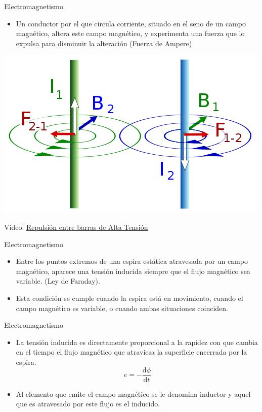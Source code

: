 \documentclass[xcolor={usenames,svgnames,dvipsnames}]{beamer}
\begin{document}
\begin{frame}[label={sec:org4979ed0}]{Electromagnetismo}
\begin{itemize}
\item Un conductor por el que circula corriente, situado en el seno de un
campo magnético, altera este campo magnético, y experimenta una
fuerza que lo expulsa para disminuir la alteración (Fuerza de Ampere)
\end{itemize}

\begin{center}
\includegraphics[width=.9\linewidth]{../figs/FuerzasRepulsion.png}
\end{center}

\begin{center}
Vídeo: \href{http://www.youtube.com/watch?v=2j8D\_N1v0tU}{Repulsión entre barras de Alta Tensión}
\end{center}
\end{frame}

\begin{frame}[label={sec:org465bf10}]{Electromagnetismo}
\begin{itemize}
\item Entre los puntos extremos de una espira estática atravesada por un
campo magnético, aparece una \alert{tensión inducida siempre que el flujo
magnético sea variable}. (Ley de Faraday).

\item Esta condición se cumple cuando la \alert{espira está en movimiento,}
cuando el \alert{campo magnético es variable}, o cuando ambas situaciones
coinciden.
\end{itemize}
\end{frame}

\begin{frame}[label={sec:orgf16c7cb}]{Electromagnetismo}
\begin{itemize}
\item La tensión inducida es directamente proporcional a la rapidez con que
cambia en el tiempo el flujo magnético que atraviesa la superficie
encerrada por la espira. $$e=-\frac{\mathrm{d}\phi}{\mathrm{d}t}$$

\item Al elemento que emite el campo magnético se le denomina \alert{inductor} y
aquel que es atravesado por este flujo es el \alert{inducido}.
\end{itemize}
\end{frame}
\end{document}
